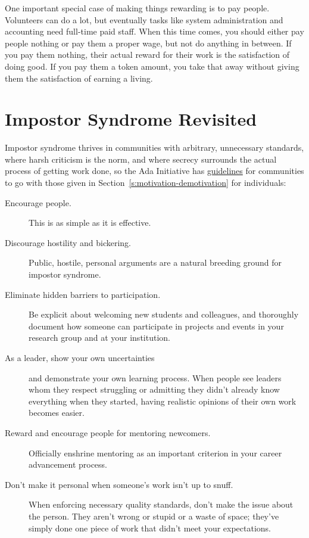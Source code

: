 One important special case of making things rewarding is to pay people.
Volunteers can do a lot, but eventually tasks like system administration
and accounting need full-time paid staff. When this time comes, you
should either pay people nothing or pay them a proper wage, but not do
anything in between. If you pay them nothing, their actual reward for
their work is the satisfaction of doing good. If you pay them a token
amount, you take that away without giving them the satisfaction of
earning a living.

\section{Impostor Syndrome Revisited}\label{s:community-impostor-syndrome}

Impostor syndrome thrives in communities with arbitrary, unnecessary
standards, where harsh criticism is the norm, and where secrecy
surrounds the actual process of getting work done, so the Ada
Initiative has \href{https://www.usenix.org/blog/impostor-syndrome-proof-yourself-and-your-community}{guidelines} for communities to go with
those given in Section~\ref{s:motivation-demotivation} for individuals:

\begin{description}
\item[Encourage people.]
This is as simple as it is effective.
\item[Discourage hostility and bickering.]
Public, hostile, personal arguments are a natural breeding ground
for impostor syndrome.
\item[Eliminate hidden barriers to participation.]
Be explicit about welcoming new students and colleagues, and
thoroughly document how someone can participate in projects and
events in your research group and at your institution.
\item[As a leader, show your own uncertainties]
and demonstrate your own learning process. When people see leaders
whom they respect struggling or admitting they didn't already know
everything when they started, having realistic opinions of their own
work becomes easier.
\item[Reward and encourage people for mentoring newcomers.]
Officially enshrine mentoring as an important criterion in your
career advancement process.
\item[Don't make it personal when someone's work isn't up to snuff.]
When enforcing necessary quality standards, don't make the issue
about the person. They aren't wrong or stupid or a waste of space;
they've simply done one piece of work that didn't meet your
expectations.
\end{description}


